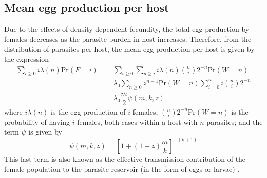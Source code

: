 \documentclass[12pt,a4paper]{article}
\theoremstyle{plain}%
\theoremstyle{definition}
\theoremstyle{remark}
\begin{document}
\subsection{Mean egg production per host}
Due to the effects of density-dependent fecundity, the total egg production by females decreases as the parasite burden in host increases.
Therefore, from the distribution of parasites per host, the mean egg production per host %
is given by the expression
\begin{equation}\label{egg}
\begin{split}
\sum_{i\geq 0}i\lambda(n)\mathrm{Pr}(F=i) &=\sum_{i\geq 0}\sum_{n\geq i} i\lambda(n) \binom{n}{i}2^{-n} \mathrm{Pr}(W=n)\\
&=\lambda_0\sum_{n\geq 0}z^{n-1} \mathrm{Pr}(W=n) \sum_{i=0}^{n} i\binom{n}{i}2^{-n}\\
&=\lambda_0\dfrac{ m}{2} \psi(m,k,z)
\end{split}
\end{equation}
where $i\lambda(n)$ is the egg production of $i$ females, $\binom{n}{i}2^{-n} \mathrm{Pr}(W=n)$ is the probability of having $i$ females, both cases within a host with $n$ parasites; and the term $\psi$ is given by
 \begin{equation}
\psi(m,k,z)=\left[ 1+(1-z)\dfrac{m}{k}\right]^{-(k+1)}
\end{equation}
This last term is also known as the effective transmission contribution of the female population to the parasite reservoir (in the form of eggs or larvae) \cite{churcher2006density}.
\end{document}
